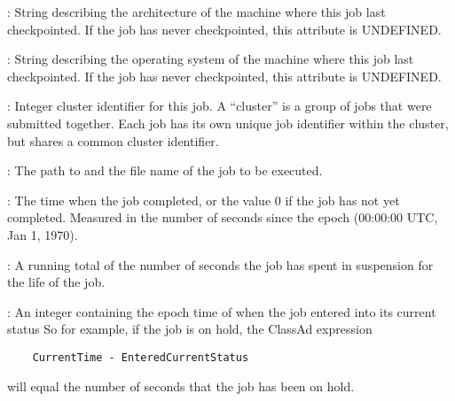 \begin{description}


\item[\AdAttr{CkptArch}] : String describing the architecture of the machine
where this job last checkpointed.  If the job has never checkpointed,
this attribute is UNDEFINED.

\item[\AdAttr{CkptOpSys}] : String describing the operating system of
the machine where this job last checkpointed.  If the job has never
checkpointed, this attribute is UNDEFINED.

\item[\AdAttr{ClusterId}] : Integer cluster identifier for this job.
A ``cluster'' is a group of jobs that were submitted together.  Each
job has its own unique job identifier within the cluster, but shares a
common cluster identifier.

\item[\AdAttr{Cmd}] : The path to and the file name of the job to be executed.

\item[\AdAttr{CompletionDate}] : The time when the job completed,
or the value 0 if the job has not yet completed.
Measured in the
number of seconds since the epoch (00:00:00 UTC, Jan 1, 1970).

\item[\AdAttr{CumulativeSuspensionTime}] : A running total of the number of
seconds the job has spent in suspension for the life of the job.

\item[\AdAttr{EnteredCurrentStatus}] : An integer containing the
epoch time of when the job entered into its current status
So for example, if the job is on hold, the ClassAd expression
\begin{verbatim}
    CurrentTime - EnteredCurrentStatus
\end{verbatim}
will equal the number of seconds that the job has been on hold.


\end{description}
